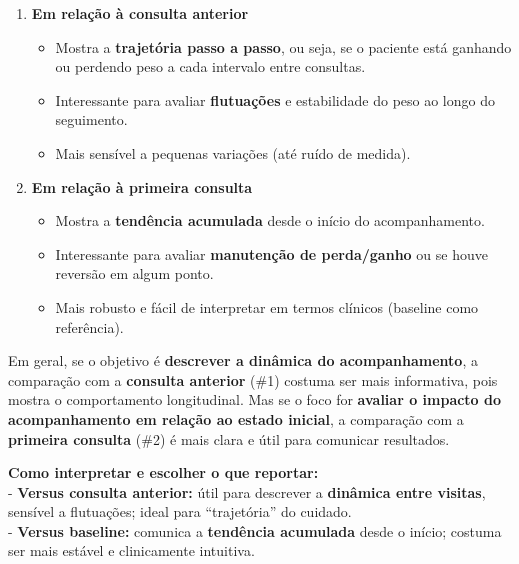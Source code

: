 \documentclass[
]{article}
\providecommand{\tightlist}{%
  \setlength{\itemsep}{0pt}\setlength{\parskip}{0pt}}\usepackage{longtable,booktabs,array}
\begin{document}
\begin{enumerate}
\def\labelenumi{\arabic{enumi}.}
\tightlist
\item
  \textbf{Em relação à consulta anterior}

  \begin{itemize}
  \tightlist
  \item
    Mostra a \textbf{trajetória passo a passo}, ou seja, se o paciente
    está ganhando ou perdendo peso a cada intervalo entre consultas.\\
  \item
    Interessante para avaliar \textbf{flutuações} e estabilidade do peso
    ao longo do seguimento.\\
  \item
    Mais sensível a pequenas variações (até ruído de medida).
  \end{itemize}
\item
  \textbf{Em relação à primeira consulta}

  \begin{itemize}
  \tightlist
  \item
    Mostra a \textbf{tendência acumulada} desde o início do
    acompanhamento.\\
  \item
    Interessante para avaliar \textbf{manutenção de perda/ganho} ou se
    houve reversão em algum ponto.\\
  \item
    Mais robusto e fácil de interpretar em termos clínicos (baseline
    como referência).
  \end{itemize}
\end{enumerate}

Em geral, se o objetivo é \textbf{descrever a dinâmica do
acompanhamento}, a comparação com a \textbf{consulta anterior} (\#1)
costuma ser mais informativa, pois mostra o comportamento longitudinal.
Mas se o foco for \textbf{avaliar o impacto do acompanhamento em relação
ao estado inicial}, a comparação com a \textbf{primeira consulta} (\#2)
é mais clara e útil para comunicar resultados.

\textbf{Como interpretar e escolher o que reportar:}\\
- \textbf{Versus consulta anterior:} útil para descrever a
\textbf{dinâmica entre visitas}, sensível a flutuações; ideal para
``trajetória'' do cuidado.\\
- \textbf{Versus baseline:} comunica a \textbf{tendência acumulada}
desde o início; costuma ser mais estável e clinicamente intuitiva.
\end{document}
